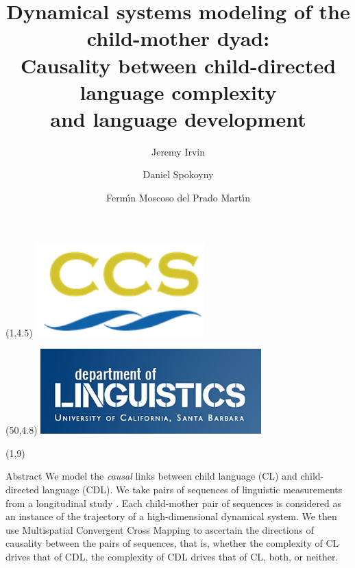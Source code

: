 \documentclass[final]{beamer}
\title{Dynamical systems modeling of the child-mother dyad:\\ \vspace{0.15em}
Causality between child-directed language complexity \\ 
\vspace{0.15em}
and language development \vspace{0.15em}}
\author[shortname]{Jeremy Irvin 
\and Daniel Spokoyny 
\and Ferm\'{\i}n Moscoso del Prado Mart\'{\i}n 
}
\date{}
\begin{document}
\begin{frame}{} 

\begin{textblock}{10}(1,4.5)
\includegraphics[width=6.5cm]{ccs.png}
\end{textblock}

\begin{textblock}{10}(50,4.8)
\includegraphics[width=8.5cm]{ling.jpg}
\end{textblock}

\begin{textblock}{22}(1,9)
\begin{block}{Abstract}
We model the \emph{causal} links between child language (CL) and child-directed language (CDL). We take pairs of sequences of linguistic measurements from a longitudinal study \cite{MacWhinney14, Theakston01}. Each child-mother pair of sequences is considered as an instance of the trajectory of a high-dimensional dynamical system. We then use Multispatial Convergent Cross Mapping \cite{Clark15} to ascertain the directions of causality between the pairs of sequences, that is, whether the complexity of CL drives that of CDL, the complexity of CDL drives that of CL, both, or neither.
\end{block}


\end{textblock}
\end{frame}
\end{document}
